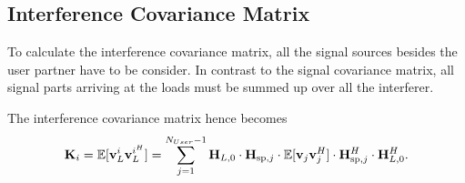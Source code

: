 \subsection{Interference Covariance Matrix}
\label{sec:int_cov}

To calculate the interference covariance matrix, all the signal sources besides the user partner have to be consider.
In contrast to the signal covariance matrix, all signal parts arriving at the loads must be summed up over all the interferer.

The interference covariance matrix hence becomes 
\begin{equation}
\label{eq:interf_cov}
\mathbf{K}_i=\mathbb{E}[\mathbf{v}_L^i\mathbf{v}_L^{i^H}] = \sum_{j=1}^{N_{User}-1} 
	\mathbf{H}_{L,0} \cdot \mathbf{H}_{\text{sp},j} \cdot 
	\mathbb{E}[\mathbf{v}_{j}\mathbf{v}_{j}^H] \cdot 
	\mathbf{H}_{\text{sp},j}^H \cdot \mathbf{H}_{L,0}^H.
\end{equation}









